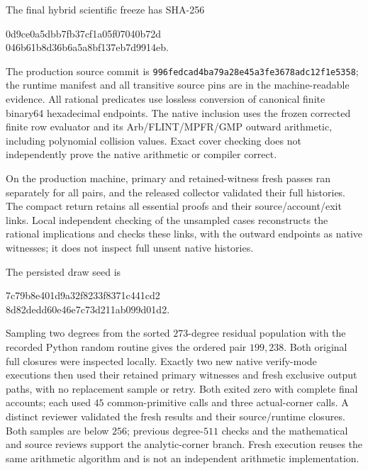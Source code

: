 The final hybrid scientific freeze has SHA-256
\begin{center}\ttfamily\footnotesize
 0d9ce0a5dbb7fb37cf1a05f07040b72d\\
 046b61b8d36b6a5a8bf137eb7d9914eb.
\end{center}
The production source commit is
\texttt{996fedcad4ba79a28e45a3fe3678adc12f1e5358}; the runtime manifest
and all transitive source pins are in the machine-readable evidence.
All rational predicates use lossless conversion of canonical finite
binary64 hexadecimal endpoints.  The native inclusion uses the frozen
corrected finite row evaluator and its Arb/FLINT/MPFR/GMP outward
arithmetic, including polynomial collision values.  Exact cover checking
does not independently prove the native arithmetic or compiler correct.

On the production machine, primary and retained-witness fresh passes
ran separately for all pairs, and the released collector validated
their full histories.  The compact return retains all essential proofs
and their source/account/exit links.  Local independent checking of
the unsampled cases reconstructs the rational implications and checks
these links, with the outward endpoints as native witnesses; it does
not inspect full unsent native histories.

The persisted draw seed is
\begin{center}\ttfamily\footnotesize
 7c79b8e401d9a32f8233f8371c441cd2\\
 8d82dedd60e46e7c73d211ab099d01d2.
\end{center}
Sampling two degrees from the sorted $273$-degree residual population
with the recorded Python random routine gives the ordered pair
$199,238$.  Both original full closures were inspected locally.
Exactly two new native verify-mode executions then used their retained
primary witnesses and fresh exclusive output paths, with no replacement
sample or retry.  Both exited zero with complete final accounts; each
used $45$ common-primitive calls and three actual-corner calls.  A
distinct reviewer validated the fresh results and their source/runtime
closures.  Both samples are below $256$; previous degree-$511$ checks
and the mathematical and source reviews support the analytic-corner
branch.  Fresh execution reuses the same arithmetic algorithm and is
not an independent arithmetic implementation.

